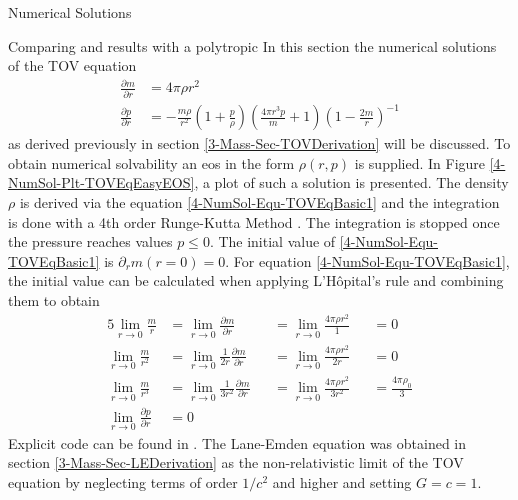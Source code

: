 \begin{section}{Numerical Solutions}
\begin{subsection}{Comparing  and  results with a polytropic }
\label{4-NumSol-Sec-Comp-TOV-LE}
In this section the numerical solutions of the \ac{TOV} equation
\begin{align}
	\frac{\partial m}{\partial r} &= 4\pi\rho r^2\label{4-NumSol-Equ-TOVEqBasic1}\\
	\frac{\partial p}{\partial r} &=-\frac{m\rho}{r^2}\left(1+\frac{p}{\rho}\right)\left(\frac{4\pi r^3p}{m}+1\right)\left(1-\frac{2m}{r}\right)^{-1}
	\label{4-NumSol-Equ-TOVEqBasic2}
\end{align}
as derived previously in section \ref{3-Mass-Sec-TOVDerivation} will be discussed.
To obtain numerical solvability an \ac{eos} in the form $\rho(r,p)$ is supplied.
In Figure \ref{4-NumSol-Plt-TOVEqEasyEOS}, a plot of such a solution is presented.
The density $\rho$ is derived via the equation \eqref{4-NumSol-Equ-TOVEqBasic1} and the integration is done with a 4th order Runge-Kutta Method \cite{rungeUeberNumerischeAufloesung1895, schlömilch1901zeitschrift, h.SimplifiedDerivationAnalysis2010}.
The integration is stopped once the pressure reaches values $p\leq0$. 
The initial value of \eqref{4-NumSol-Equ-TOVEqBasic1} is $\partial_r m(r=0)=0$. 
For equation \eqref{4-NumSol-Equ-TOVEqBasic1}, the initial value can be calculated when applying L'Hôpital's rule and combining them to obtain
\begin{alignat}{5}
	\lim\limits_{r\rightarrow0}\frac{m}{r} &= \lim\limits_{r\rightarrow0}\frac{\partial m}{\partial r} &&=\lim\limits_{r\rightarrow0}\frac{4\pi\rho r^2}{1} &&= 0\\
	\lim\limits_{r\rightarrow0}\frac{m}{r^2} &= \lim\limits_{r\rightarrow0}\frac{1}{2r}\frac{\partial m}{\partial r}  &&= \lim\limits_{r\rightarrow0}\frac{4\pi\rho r^2}{2r} &&= 0\\
	\lim\limits_{r\rightarrow0}\frac{m}{r^3} &= \lim\limits_{r\rightarrow0}\frac{1}{3r^2}\frac{\partial m}{\partial r} &&=\lim\limits_{r\rightarrow0}\frac{4\pi\rho r^2}{3r^2} &&= \frac{4\pi\rho_0}{3}\\
	\lim\limits_{r\rightarrow0}\frac{\partial p}{\partial r} &= 0
\end{alignat}
Explicit code can be found in \cite{pleyerGithubRepositoryJonas2021}. 
The Lane-Emden equation was obtained in section \ref{3-Mass-Sec-LEDerivation} as the non-relativistic limit of the \ac{TOV} equation by neglecting terms of order $1/c^2$ and higher and setting $G=c=1$. 

\end{subsection}
\end{section}
